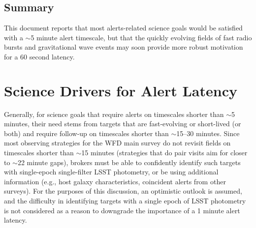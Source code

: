 \documentclass[DM,lsstdraft,authoryear,toc]{lsstdoc}
\begin{document}
\subsection{Summary}

This document reports that most alerts-related science goals would be satisfied with a $\sim$5 minute alert timescale, but that the quickly evolving fields of fast radio bursts and gravitational wave events may soon provide more robust motivation for a 60 second latency.



\clearpage
\section{Science Drivers for Alert Latency} \label{sec:latency}

Generally, for science goals that require alerts on timescales shorter than $\sim$5 minutes, their need stems from targets that are fast-evolving or short-lived (or both) and require follow-up on timescales shorter than $\sim$15--30 minutes.
Since most observing strategies for the WFD main survey do not revisit fields on timescales shorter than $\sim$15 minutes (strategies that do pair visits aim for closer to $\sim$22 minute gaps), brokers must be able to confidently identify such targets with single-epoch single-filter LSST photometry, or be using additional information (e.g., host galaxy characteristics, coincident alerts from other surveys).
For the purposes of this discussion, an optimistic outlook is assumed, and the difficulty in identifying targets with a single epoch of LSST photometry is not considered as a reason to downgrade the importance of a 1 minute alert latency.
\end{document}
